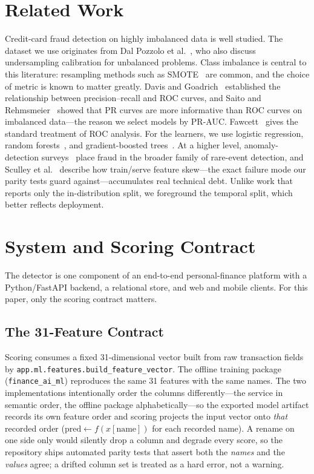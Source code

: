 \documentclass[conference]{IEEEtran}
\begin{document}
\section{Related Work}
Credit-card fraud detection on highly imbalanced data is well studied. The
dataset we use originates from Dal Pozzolo et al.~\cite{dalpozzolo2015}, who
also discuss undersampling calibration for unbalanced problems. Class
imbalance is central to this literature: resampling methods such as
SMOTE~\cite{chawla2002} are common, and the choice of metric is known to
matter greatly. Davis and Goadrich~\cite{davis2006} established the
relationship between precision--recall and ROC curves, and Saito and
Rehmsmeier~\cite{saito2015} showed that PR curves are more informative than
ROC curves on imbalanced data---the reason we select models by PR-AUC.
Fawcett~\cite{fawcett2006} gives the standard treatment of ROC analysis.
For the learners, we use logistic regression, random
forests~\cite{breiman2001}, and gradient-boosted trees~\cite{chen2016}. At a
higher level, anomaly-detection surveys~\cite{chandola2009} place fraud in the
broader family of rare-event detection, and Sculley et
al.~\cite{sculley2015} describe how train/serve feature skew---the exact
failure mode our parity tests guard against---accumulates real technical debt.
Unlike work that reports only the in-distribution split, we foreground the
temporal split, which better reflects deployment.

\section{System and Scoring Contract}
The detector is one component of an end-to-end personal-finance platform with
a Python/FastAPI backend, a relational store, and web and mobile clients. For
this paper, only the scoring contract matters.

\subsection{The 31-Feature Contract}
Scoring consumes a fixed 31-dimensional vector built from raw transaction
fields by \texttt{app.ml.features.build\_feature\_vector}. The offline
training package (\texttt{finance\_ai\_ml}) reproduces the same 31 features
with the same names. The two implementations intentionally order the columns
differently---the service in semantic order, the offline package
alphabetically---so the exported model artifact records its own feature order
and scoring projects the input vector onto \emph{that} recorded order
($\text{pred}\leftarrow f(x[\text{name}])$ for each recorded name). A rename
on one side only would silently drop a column and degrade every score, so the
repository ships automated parity tests that assert both the \emph{names} and
the \emph{values} agree; a drifted column set is treated as a hard error, not
a warning.
\end{document}
